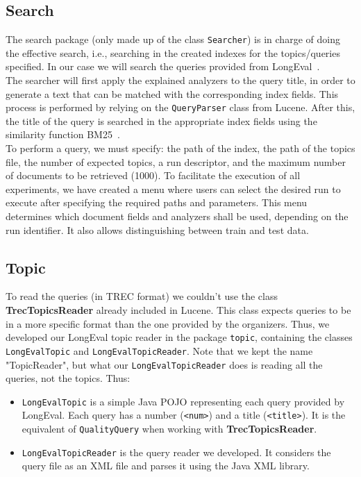 \subsection{Search}\label{subsec:search}
The search package (only made up of the class \texttt{Searcher}) is in charge of doing the effective search, i.e.,
searching in the created indexes for the topics/queries specified.
In our case we will search the queries provided from LongEval~\cite{traindata}.\\

The searcher will first apply the explained analyzers to the query title, in order to generate a text that can be
matched with the corresponding index fields.
This process is performed by relying on the \texttt{QueryParser} class from Lucene.
After this, the title of the query is searched in the appropriate index fields using the similarity function
BM25~\cite{BM25}.\\

To perform a query, we must specify: the path of the index, the path of the topics file, the number of expected topics,
a run descriptor, and the maximum number of documents to be retrieved (1000).
To facilitate the execution of all experiments, we have created a menu where users can select the desired run to execute
after specifying the required paths and parameters.
This menu determines which document fields and analyzers shall be used, depending on the run identifier.
It also allows distinguishing between train and test data.\\

\subsection{Topic}\label{subsec:topic}

To read the queries (in TREC format) we couldn't use the class \textbf{TrecTopicsReader} already included in Lucene.
This class expects queries to be in a more specific format than the one provided by the organizers.
Thus, we developed our LongEval topic reader in the package \texttt{topic}, containing the classes
\texttt{LongEvalTopic} and \texttt{LongEvalTopicReader}.
Note that we kept the name "TopicReader", but what our \texttt{LongEvalTopicReader} does is reading all the queries,
not the topics.
Thus:
\begin{itemize}
    \item \texttt{LongEvalTopic} is a simple Java POJO representing each query provided by LongEval.
          Each query has a number (\texttt{<num>}) and a title (\texttt{<title>}).
          It is the equivalent of \texttt{QualityQuery} when working with \textbf{TrecTopicsReader}.
    \item \texttt{LongEvalTopicReader} is the query reader we developed.
          It considers the query file as an XML file and parses it using the Java XML library.
\end{itemize}